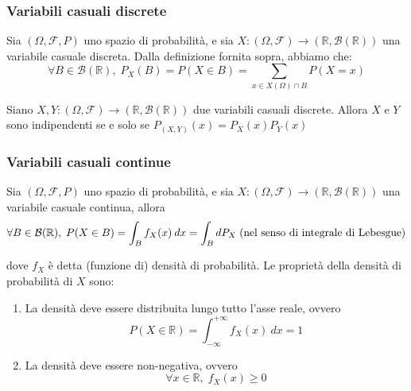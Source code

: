             \subsubsection{Variabili casuali discrete}
                Sia $(\Omega, \mathcal{F}, P)$ uno spazio di probabilità, e sia $X: (\Omega, \mathcal{F}) \rightarrow (\mathbb{R}, \mathcal{B}(\mathbb{R}))$ una variabile casuale discreta.
                Dalla definizione fornita sopra, abbiamo che:
                \[
                    \forall B \in \mathcal{B}(\mathbb{R}), \; P_{X}(B) = P(X \in B) = \sum_{x \in X(\Omega) \cap B} P(X = x)
                \]

                \begin{theorem}
                    Siano $X, Y: (\Omega, \mathcal{F}) \rightarrow (\mathbb{R}, \mathcal{B}(\mathbb{R}))$ due variabili casuali discrete.
                    Allora $X$ e $Y$ sono indipendenti se e solo se $P_{(X, Y)}(x) = P_{X}(x)P_{Y}(x)$
                \end{theorem}

            \subsubsection{Variabili casuali continue}
                Sia $(\Omega, \mathcal{F}, P)$ uno spazio di probabilità, e sia $X: (\Omega, \mathcal{F}) \rightarrow (\mathbb{R}, \mathcal{B}(\mathbb{R}))$ una variabile casuale continua, allora
                \[
                    \forall B \in \mathcal{B}(\mathbb{R}), \; P(X \in B) = \int_{B} f_{X}(x) \: dx = \int_{B} d{P}_{X} \; \textnormal{(nel senso di integrale di Lebesgue)}
                \]

                dove $f_{X}$ è detta (funzione di) densità di probabilità.
                Le proprietà della densità di probabilità di $X$ sono:

                \begin{enumerate}
                    \item La densità deve essere distribuita lungo tutto l'asse reale, ovvero
                    \[
                        P(X \in \mathbb{R}) = \int_{-\infty}^{+\infty} f_{X}(x) \: dx = 1
                    \]

                    \item La densità deve essere non-negativa, ovvero
                    \[
                        \forall x \in \mathbb{R}, \; f_{X}(x) \geq 0
                    \]
                \end{enumerate}

